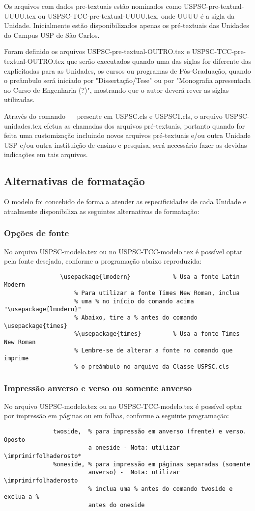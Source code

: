 Os arquivos com dados pre-textuais estão nominados como USPSC-pre-textual-UUUU.tex ou USPSC-TCC-pre-textual-UUUU.tex, onde UUUU é a sigla da Unidade. Inicialmente estão disponibilizados apenas os pré-textuais das Unidades do Campus USP de São Carlos.
			
Foram definido os arquivos USPSC-pre-textual-OUTRO.tex e USPSC-TCC-pre-textual-OUTRO.tex que serão executados quando uma das siglas for diferente das explicitadas para as Unidades, os cursos ou programas de Pós-Graduação, quando o preâmbulo será iniciado por "Dissertação/Tese"   ou por "Monografia apresentada ao Curso de Engenharia (?)", mostrando que o autor deverá rever as siglas utilizadas.

Através do comando \verb+  + presente em USPSC.cls e USPSC1.cls,  o arquivo USPSC-unidades.tex efetua as chamadas dos arquivos pré-textuais, portanto quando for feita uma customização incluindo novos arquivos pré-textuais e/ou outra Unidade USP e/ou outra instituição de ensino e pesquisa, será necessário fazer as devidas indicações em tais arquivos. 
	 
\subsection{Alternativas de formatação}
O modelo foi concebido de forma a atender as especificidades de cada Unidade e atualmente disponibiliza as seguintes alternativas de formatação:
\subsubsection{Opções de fonte} 
No arquivo USPSC-modelo.tex ou no USPSC-TCC-modelo.tex é possível optar pela fonte desejada, conforme a programação abaixo reproduzida:
				\begin{verbatim}
				\usepackage{lmodern}			% Usa a fonte Latin Modern
					% Para utilizar a fonte Times New Roman, inclua 
					% uma % no início do comando acima  "\usepackage{lmodern}"
					% Abaixo, tire a % antes do comando  \usepackage{times}
					%\usepackage{times}			% Usa a fonte Times New Roman
					% Lembre-se de alterar a fonte no comando que imprime 
					% o preâmbulo no arquivo da Classe USPSC.cls					
				\end{verbatim}
\subsubsection{Impressão anverso e verso ou somente anverso}
No arquivo USPSC-modelo.tex ou no USPSC-TCC-modelo.tex é possível optar por impressão em páginas ou em folhas, conforme a seguinte programação:
			  \begin{verbatim}
			  twoside,  % para impressão em anverso (frente) e verso. Oposto 
			            a oneside - Nota: utilizar \imprimirfolhaderosto*
			  %oneside, % para impressão em páginas separadas (somente 
			            anverso) -  Nota: utilizar \imprimirfolhaderosto
			            % inclua uma % antes do comando twoside e exclua a % 
			            antes do oneside 
			  \end{verbatim}			  
